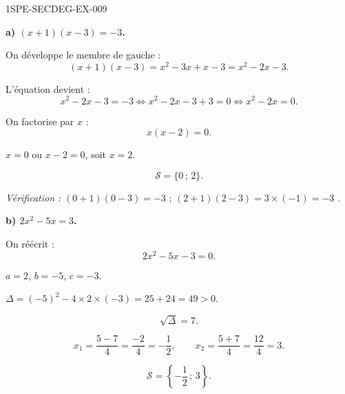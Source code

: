 \begin{corrige}{1SPE-SECDEG-EX-009}

\textbf{a) $(x+1)(x-3) = -3$.}


On développe le membre de gauche :
\[(x+1)(x-3) = x^2 - 3x + x - 3 = x^2 - 2x - 3.\]

L'équation devient :
\[x^2 - 2x - 3 = -3 \iff x^2 - 2x - 3 + 3 = 0 \iff x^2 - 2x = 0.\]

On factorise par $x$ :
\[x(x - 2) = 0.\]


$x = 0$ ou $x - 2 = 0$, soit $x = 2$.

\[\boxed{\mathcal{S} = \{0\,;\,2\}.}\]

\textit{Vérification :} $(0+1)(0-3) = -3$ \checkmark\; ; \; $(2+1)(2-3) = 3\times(-1) = -3$ \checkmark.

\medskip
\textbf{b) $2x^2 - 5x = 3$.}


On réécrit :
\[2x^2 - 5x - 3 = 0.\]

$a = 2$, $b = -5$, $c = -3$.

$\Delta = (-5)^2 - 4 \times 2 \times (-3) = 25 + 24 = 49 > 0$.

\[\sqrt{\Delta} = 7.\]

\[x_1 = \frac{5 - 7}{4} = \frac{-2}{4} = -\frac{1}{2}, \qquad x_2 = \frac{5 + 7}{4} = \frac{12}{4} = 3.\]

\[\boxed{\mathcal{S} = \left\{-\frac{1}{2}\,;\,3\right\}.}\]

\end{corrige}
